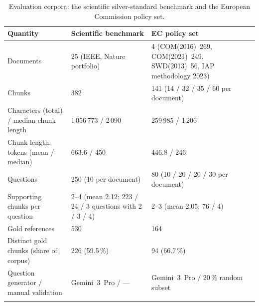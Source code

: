 \documentclass[pdflatex,sn-mathphys-num]{sn-jnl}
\newif\ifprovenance
\newcommand{\verify}[1]{\ifprovenance\textcolor{red}{{\footnotesize [VERIFY: #1]}}\fi}
\theoremstyle{thmstyleone}%
\theoremstyle{thmstylethree}%
\begin{document}
\begin{table}[htbp]
\caption{Evaluation corpora: the scientific silver-standard benchmark and the European Commission policy set.}\label{tab:corpora}
\begin{tabular}{@{}p{4.0cm}p{4.0cm}p{4.2cm}@{}}
\toprule
Quantity & Scientific benchmark & EC policy set \\
\midrule
Documents & 25 (IEEE, Nature portfolio) & 4 (COM(2016)~269, COM(2021)~249, SWD(2013)~56, IAP methodology 2023) \\
Chunks & 382 & 141 (14 / 32 / 35 / 60 per document) \\
Characters (total) / median chunk length & 1\,056\,773 / 2\,090 & 259\,985 / 1\,206 \\
Chunk length, tokens (mean / median) & 663.6 / 450 & 446.8 / 246 \\
Questions & 250 (10 per document) & 80 (10 / 20 / 20 / 30 per document) \\
Supporting chunks per question & 2--4 (mean 2.12; 223 / 24 / 3 questions with 2 / 3 / 4) & 2--3 (mean 2.05; 76 / 4) \\
Gold references & 530 & 164 \\
Distinct gold chunks (share of corpus) & 226 (59.5\,\%) & 94 (66.7\,\%) \\
Question generator / manual validation & Gemini~3~Pro / --- & Gemini~3~Pro / 20\,\% random subset \\
\botrule
\end{tabular}
\ifprovenance\footnotetext{\verify{Chunk counts, character statistics and per-document chunk counts: read-only pass over \texttt{RnD/split\_documents/*.json} and \texttt{RnD/split\_documents/smoking/*.json}; question statistics: \texttt{RnD/q\_and\_a/Gemini/scientific\_multi\_chunk\_control.json} and \texttt{RnD/q\_and\_a/Gemini/smoking.json} (count the \texttt{supporting\_chunks} lists; distinct gold ids as a set); token statistics: \texttt{len(tokenizer.tokenize(text))} with the nomic tokenizer over \texttt{RnD/split\_documents/*.json} (mean 663.58, median 450, total 253\,488) and over the final 141 records of \texttt{RnD/split\_documents/smoking/*.json} (mean 446.80, median 246, min 1, max 1\,992, total 62\,999); the 420.94 printed by cell~2 of \texttt{RnD/doc\_slice\_chunking.ipynb} refers to an earlier 144-chunk version of the policy corpus; scripts: \texttt{RnD/verification/chunk\_character\_statistics.py} and \texttt{chunk\_token\_statistics.py}.}}\fi
\end{table}
\end{document}
